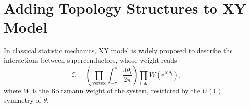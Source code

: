 
\section{Adding Topology Structures to XY Model}
In classical statistic mechanics, XY model is widely proposed to describe the interactions between superconductors, whose weight reads
\begin{equation}
  \mathcal{Z} = \left( \prod_{\text{vertex}}^{} \int_{-\pi}^{\pi} \frac{\mathrm{d} \theta _{l}}{2\pi} \right) \prod_{\text{link}}^{} W \left( \mathrm{e}^{\mathrm{i} \mathrm{d} \theta_{l}} \right),
\end{equation}
where $W$ is the Boltzmann weight of the system, restricted by the $U(1)$ symmetry of $\theta$.